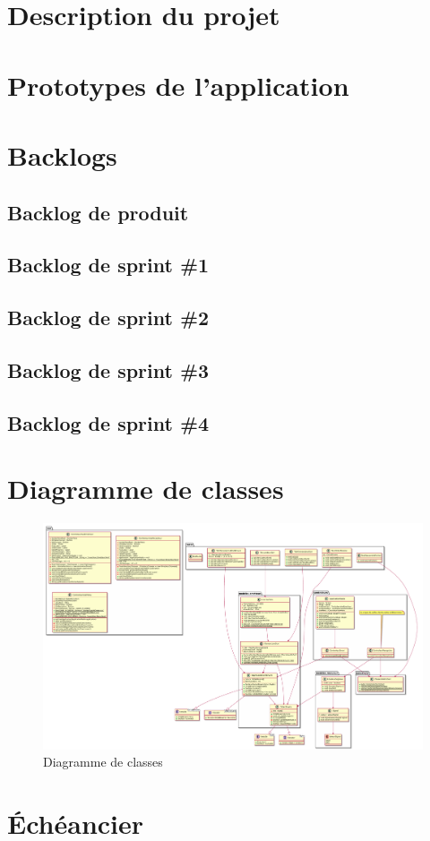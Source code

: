 \documentclass{article}
\begin{document}

\tableofcontents

\newpage

\section{Description du projet}
    

\section{Prototypes de l'application}
    

\newpage

\section{Backlogs}
    \subsection{Backlog de produit}
        

\newpage

    \subsection{Backlog de sprint \#1}
        
    \subsection{Backlog de sprint \#2}
        
    \subsection{Backlog de sprint \#3}
        
    \subsection{Backlog de sprint \#4}
        

\section{Diagramme de classes}
    \begin{figure}[ht!]
        \centering
        \caption{Diagramme de classes}
        \includegraphics[width=0.8\linewidth]{images/diagramme_classes.pdf}
    \end{figure}

\section{Échéancier}
    
\end{document}
